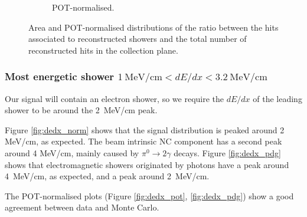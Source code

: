 \begin{figure}[htbp]
\begin{subfigure}{0.49\textwidth}
    \caption{POT-normalised.} \label{fig:ratio_pot}
  \end{subfigure}
  \caption{Area and POT-normalised distributions of the ratio between the hits associated to reconstructed showers and the total number of reconstructed hits in the collection plane.}
\end{figure}


\subsubsection*{Most energetic shower $1~\mathrm{MeV/cm} < dE/dx <3.2~\mathrm{MeV/cm}$}
Our signal will contain an electron shower, so we require the $dE/dx$ of the leading shower to be around the 2~MeV/cm peak.

Figure \ref{fig:dedx_norm} shows that the signal distribution is peaked around 2 MeV/cm, as expected. The beam intrinsic NC component has a second peak around 4 MeV/cm, mainly caused by $\pi^0\rightarrow2\gamma$ decays. 
Figure \ref{fig:dedx_pdg} shows that electromagnetic showers originated by photons have a peak around 4~MeV/cm, as expected, and a peak around 2~MeV/cm. 

The POT-normalised plots (Figure \ref{fig:dedx_pot}, \ref{fig:dedx_pdg}) show a good agreement between data and Monte Carlo.

